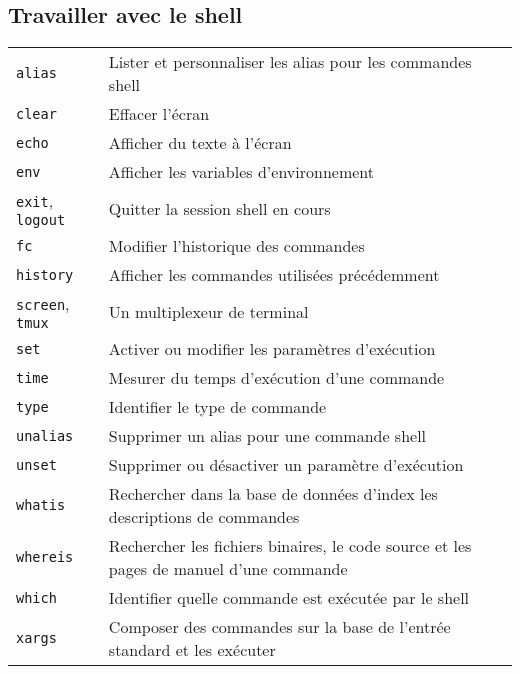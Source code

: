 \documentclass[10pt,a4paper]{article}
\begin{document}
\begin{multicols}{2}
\section{Travailler avec le shell}
\begin{tabular}{ p{2.5cm} p{8.5cm} }
  \hline
  \texttt{alias} & Lister et personnaliser les alias pour les commandes shell \\
  \texttt{clear} & Effacer l'écran \\
  \texttt{echo} & Afficher du texte à l'écran \\
  \texttt{env} & Afficher les variables d'environnement \\
  \texttt{exit}, \texttt{logout} & Quitter la session shell en cours \\
  \texttt{fc} & Modifier l'historique des commandes \\
  \texttt{history} & Afficher les commandes utilisées précédemment \\
  \texttt{screen}, \texttt{tmux} & Un multiplexeur de terminal \\
  \texttt{set} & Activer ou modifier les paramètres d'exécution \\
  \texttt{time} & Mesurer du temps d'exécution d'une commande \\
  \texttt{type} & Identifier le type de commande \\
  \texttt{unalias} & Supprimer un alias pour une commande shell \\
  \texttt{unset} & Supprimer ou désactiver un paramètre d'exécution \\
  \texttt{whatis} & Rechercher dans la base de données d'index les descriptions de commandes \\
  \texttt{whereis} & Rechercher les fichiers binaires, le code source et les pages de manuel d'une commande \\
  \texttt{which} & Identifier quelle commande est exécutée par le shell\\
  \texttt{xargs} & Composer des commandes sur la base de l'entrée standard et les exécuter\\
  \hline
\end{tabular}



\end{multicols}
\end{document}
